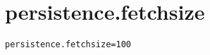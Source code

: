 \section{persistence.fetchsize}
\label{configuration:PersistenceFetchsize}
\ClearAPI
\TODO
{}
\begin{lstlisting}[style=Props,caption={Usage example for \textit{persistence.fetchsize}}]
persistence.fetchsize=100
\end{lstlisting}